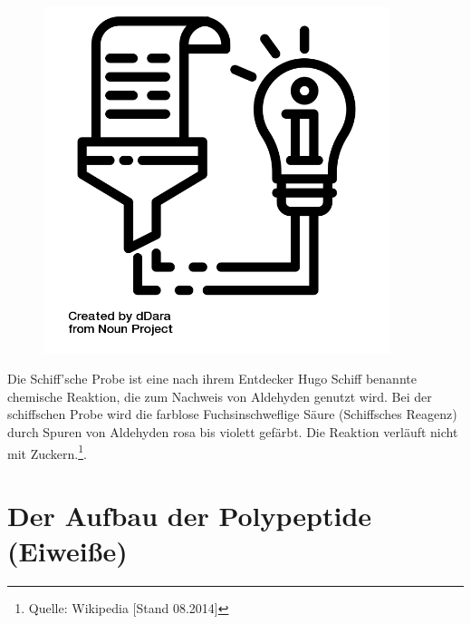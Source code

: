 \documentclass{scrartcl}  %
\begin{document}
\vspace{0.3cm}
			\begin{tcolorbox}[enhanced,
				colback=white,
				colframe=darkgray,
				fonttitle=\sffamily\bfseries\large, 
				title=Die Schiff'sche Probe,  %
				attach boxed title to top left={xshift=3.2mm,yshift=-0.50mm},
				boxed title style={skin=enhancedfirst jigsaw,size=small,arc=1mm,bottom=-1mm,colframe=darkgray,height=0.75cm},
				colbacktitle=darkgray,
				drop lifted shadow]
				\begin{figure}  
					\centering
					\vspace{-14pt}  %
					\includegraphics[width=0.9\textwidth]{symbols/symbol_tex_content}
				\end{figure}
				
				Die Schiff'sche Probe ist eine nach ihrem Entdecker Hugo Schiff benannte chemische Reaktion, die zum Nachweis von Aldehyden genutzt wird. Bei der schiffschen Probe wird die farblose Fuchsinschweflige Säure (Schiffsches Reagenz) durch Spuren von Aldehyden rosa bis violett gefärbt. \newline
				Die Reaktion verläuft nicht mit Zuckern.\footnote{Quelle: Wikipedia [Stand 08.2014]}. 
				\vspace{0.1cm}		
			\end{tcolorbox}	

\newpage
	\part{Der Aufbau der Polypeptide (Eiweiße)}
	
\end{document}
